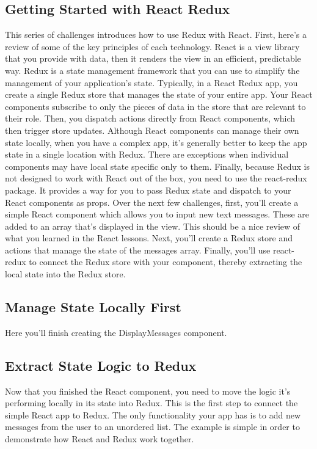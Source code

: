 \documentclass{article}%
\begin{document}
\subsection{Getting Started with React Redux}%
\label{subsec:GettingStartedwithReactRedux}%
This series of challenges introduces how to use Redux with React. First, here's a review of some of the key principles of each technology. React is a view library that you provide with data, then it renders the view in an efficient, predictable way. Redux is a state management framework that you can use to simplify the management of your application's state. Typically, in a React Redux app, you create a single Redux store that manages the state of your entire app. Your React components subscribe to only the pieces of data in the store that are relevant to their role. Then, you dispatch actions directly from React components, which then trigger store updates.\newline%
Although React components can manage their own state locally, when you have a complex app, it's generally better to keep the app state in a single location with Redux. There are exceptions when individual components may have local state specific only to them. Finally, because Redux is not designed to work with React out of the box, you need to use the react{-}redux package. It provides a way for you to pass Redux state and dispatch to your React components as props.\newline%
Over the next few challenges, first, you'll create a simple React component which allows you to input new text messages. These are added to an array that's displayed in the view. This should be a nice review of what you learned in the React lessons. Next, you'll create a Redux store and actions that manage the state of the messages array. Finally, you'll use react{-}redux to connect the Redux store with your component, thereby extracting the local state into the Redux store.\newline%

%
\subsection{Manage State Locally First}%
\label{subsec:ManageStateLocallyFirst}%
Here you'll finish creating the DisplayMessages component.\newline%

%
\subsection{Extract State Logic to Redux}%
\label{subsec:ExtractStateLogictoRedux}%
Now that you finished the React component, you need to move the logic it's performing locally in its state into Redux. This is the first step to connect the simple React app to Redux. The only functionality your app has is to add new messages from the user to an unordered list. The example is simple in order to demonstrate how React and Redux work together.\newline%
\end{document}
